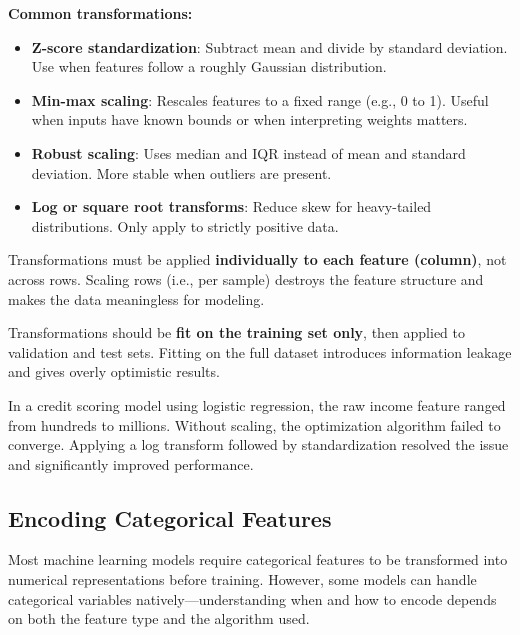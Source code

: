 \documentclass[12pt,openany]{book}
\begin{document}
\textbf{Common transformations:}
\begin{itemize}
    \item \textbf{Z-score standardization}: Subtract mean and divide by standard deviation. Use when features follow a roughly Gaussian distribution.
    \item \textbf{Min-max scaling}: Rescales features to a fixed range (e.g., 0 to 1). Useful when inputs have known bounds or when interpreting weights matters.
    \item \textbf{Robust scaling}: Uses median and IQR instead of mean and standard deviation. More stable when outliers are present.
    \item \textbf{Log or square root transforms}: Reduce skew for heavy-tailed distributions. Only apply to strictly positive data.
\end{itemize}

\begin{notebox}
Transformations must be applied \textbf{individually to each feature (column)}, not across rows. Scaling rows (i.e., per sample) destroys the feature structure and makes the data meaningless for modeling. 
\end{notebox}

\begin{notebox}
Transformations should be \textbf{fit on the training set only}, then applied to validation and test sets. Fitting on the full dataset introduces information leakage and gives overly optimistic results.
\end{notebox}

\begin{examplebox}
In a credit scoring model using logistic regression, the raw income feature ranged from hundreds to millions. Without scaling, the optimization algorithm failed to converge. Applying a log transform followed by standardization resolved the issue and significantly improved performance.
\end{examplebox}


\subsection{Encoding Categorical Features}

Most machine learning models require categorical features to be transformed into numerical representations before training. However, some models can handle categorical variables natively—understanding when and how to encode depends on both the feature type and the algorithm used. \newline
\end{document}
